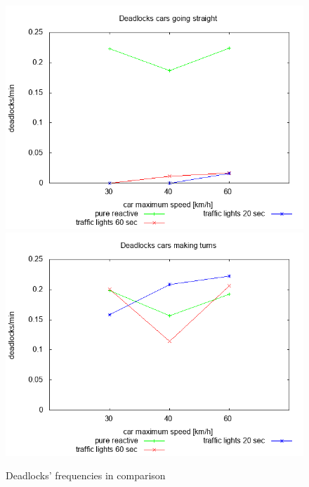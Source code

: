 \begin{figure}
\centering
\includegraphics[scale=0.35]{img/plot_deadlocksstraight}
\includegraphics[scale=0.35]{img/plot_deadlocksturns}
\caption{Deadlocks' frequencies in comparison}
\label{fig:deadlocks}
\end{figure}

